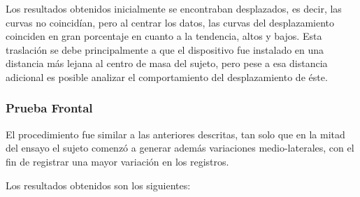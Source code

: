 \documentclass[12pt,a4paper]{article}
\begin{document}
	Los resultados obtenidos inicialmente se encontraban desplazados, es decir, las curvas no coincidían, pero al centrar los datos, las curvas del desplazamiento coinciden en gran porcentaje en cuanto a la tendencia, altos y bajos.
	Esta traslación se debe principalmente a que el dispositivo fue instalado en una distancia más lejana al centro de masa del sujeto, pero pese a esa distancia adicional es posible analizar el comportamiento del desplazamiento de éste.
	
\newpage
\subsubsection{Prueba Frontal}
El procedimiento fue similar a las anteriores descritas, tan solo que en la mitad del ensayo el sujeto comenzó a generar además variaciones medio-laterales, con el fin de registrar una mayor variación en los registros.

Los resultados obtenidos son los siguientes:
	
\end{document}

